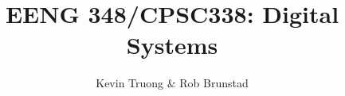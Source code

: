 \documentclass[12pt]{article}
\begin{document}
\title{EENG 348/CPSC\textsc{338}: Digital Systems}
\author{Kevin Truong \& Rob Brunstad} 
\maketitle
\end{document}
